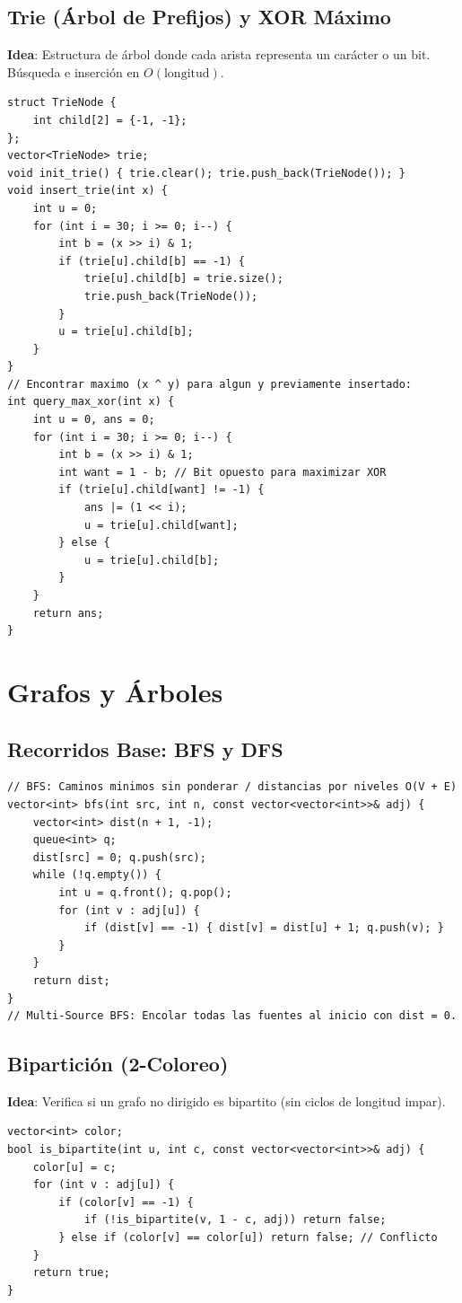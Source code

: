 \documentclass[9pt,twocolumn,a4paper]{extarticle}
\begin{document}
\subsection{Trie (Árbol de Prefijos) y XOR Máximo}
\textbf{Idea}: Estructura de árbol donde cada arista representa un carácter o un bit. Búsqueda e inserción en $O(\text{longitud})$.
\begin{lstlisting}
struct TrieNode {
    int child[2] = {-1, -1};
};
vector<TrieNode> trie;
void init_trie() { trie.clear(); trie.push_back(TrieNode()); }
void insert_trie(int x) {
    int u = 0;
    for (int i = 30; i >= 0; i--) {
        int b = (x >> i) & 1;
        if (trie[u].child[b] == -1) {
            trie[u].child[b] = trie.size();
            trie.push_back(TrieNode());
        }
        u = trie[u].child[b];
    }
}
// Encontrar maximo (x ^ y) para algun y previamente insertado:
int query_max_xor(int x) {
    int u = 0, ans = 0;
    for (int i = 30; i >= 0; i--) {
        int b = (x >> i) & 1;
        int want = 1 - b; // Bit opuesto para maximizar XOR
        if (trie[u].child[want] != -1) {
            ans |= (1 << i);
            u = trie[u].child[want];
        } else {
            u = trie[u].child[b];
        }
    }
    return ans;
}
\end{lstlisting}

\section{Grafos y Árboles}
\subsection{Recorridos Base: BFS y DFS}
\begin{lstlisting}
// BFS: Caminos minimos sin ponderar / distancias por niveles O(V + E)
vector<int> bfs(int src, int n, const vector<vector<int>>& adj) {
    vector<int> dist(n + 1, -1);
    queue<int> q;
    dist[src] = 0; q.push(src);
    while (!q.empty()) {
        int u = q.front(); q.pop();
        for (int v : adj[u]) {
            if (dist[v] == -1) { dist[v] = dist[u] + 1; q.push(v); }
        }
    }
    return dist;
}
// Multi-Source BFS: Encolar todas las fuentes al inicio con dist = 0.
\end{lstlisting}

\subsection{Bipartición (2-Coloreo)}
\textbf{Idea}: Verifica si un grafo no dirigido es bipartito (sin ciclos de longitud impar).
\begin{lstlisting}
vector<int> color;
bool is_bipartite(int u, int c, const vector<vector<int>>& adj) {
    color[u] = c;
    for (int v : adj[u]) {
        if (color[v] == -1) {
            if (!is_bipartite(v, 1 - c, adj)) return false;
        } else if (color[v] == color[u]) return false; // Conflicto
    }
    return true;
}
\end{lstlisting}
\end{document}
